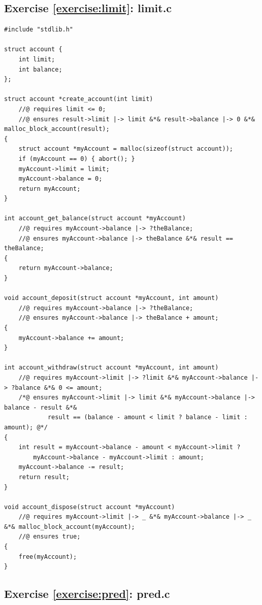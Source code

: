 \documentclass{article}
\begin{document}
\subsection{Exercise \ref{exercise:limit}: limit.c}

\begin{lstlisting}
#include "stdlib.h"

struct account {
    int limit;
    int balance;
};

struct account *create_account(int limit)
    //@ requires limit <= 0;
    //@ ensures result->limit |-> limit &*& result->balance |-> 0 &*& malloc_block_account(result);
{
    struct account *myAccount = malloc(sizeof(struct account));
    if (myAccount == 0) { abort(); }
    myAccount->limit = limit;
    myAccount->balance = 0;
    return myAccount;
}

int account_get_balance(struct account *myAccount)
    //@ requires myAccount->balance |-> ?theBalance;
    //@ ensures myAccount->balance |-> theBalance &*& result == theBalance;
{
    return myAccount->balance;
}

void account_deposit(struct account *myAccount, int amount)
    //@ requires myAccount->balance |-> ?theBalance;
    //@ ensures myAccount->balance |-> theBalance + amount;
{
    myAccount->balance += amount;
}

int account_withdraw(struct account *myAccount, int amount)
    //@ requires myAccount->limit |-> ?limit &*& myAccount->balance |-> ?balance &*& 0 <= amount;
    /*@ ensures myAccount->limit |-> limit &*& myAccount->balance |-> balance - result &*&
            result == (balance - amount < limit ? balance - limit : amount); @*/
{
    int result = myAccount->balance - amount < myAccount->limit ?
        myAccount->balance - myAccount->limit : amount;
    myAccount->balance -= result;
    return result;
}

void account_dispose(struct account *myAccount)
    //@ requires myAccount->limit |-> _ &*& myAccount->balance |-> _ &*& malloc_block_account(myAccount);
    //@ ensures true;
{
    free(myAccount);
}
\end{lstlisting}

\subsection{Exercise \ref{exercise:pred}: pred.c}
\end{document}
